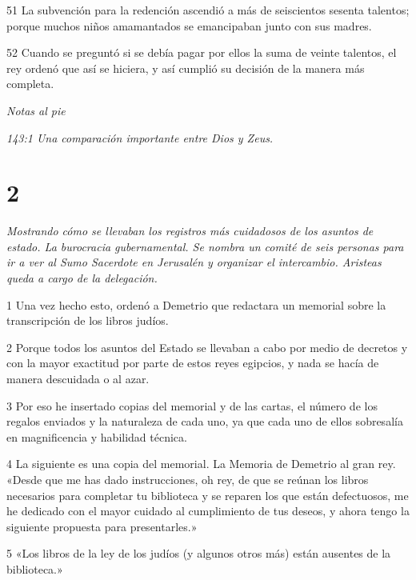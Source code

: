 \par 51 La subvención para la redención ascendió a más de seiscientos sesenta talentos; porque muchos niños amamantados se emancipaban junto con sus madres.

\par 52 Cuando se preguntó si se debía pagar por ellos la suma de veinte talentos, el rey ordenó que así se hiciera, y así cumplió su decisión de la manera más completa.

\par \textit{Notas al pie}
\par \textit{143:1 Una comparación importante entre Dios y Zeus.}

\chapter{2}

\par \textit{Mostrando cómo se llevaban los registros más cuidadosos de los asuntos de estado. La burocracia gubernamental. Se nombra un comité de seis personas para ir a ver al Sumo Sacerdote en Jerusalén y organizar el intercambio. Aristeas queda a cargo de la delegación.}

\par 1 Una vez hecho esto, ordenó a Demetrio que redactara un memorial sobre la transcripción de los libros judíos.

\par 2 Porque todos los asuntos del Estado se llevaban a cabo por medio de decretos y con la mayor exactitud por parte de estos reyes egipcios, y nada se hacía de manera descuidada o al azar.

\par 3 Por eso he insertado copias del memorial y de las cartas, el número de los regalos enviados y la naturaleza de cada uno, ya que cada uno de ellos sobresalía en magnificencia y habilidad técnica.

\par 4 La siguiente es una copia del memorial. La Memoria de Demetrio al gran rey. «Desde que me has dado instrucciones, oh rey, de que se reúnan los libros necesarios para completar tu biblioteca y se reparen los que están defectuosos, me he dedicado con el mayor cuidado al cumplimiento de tus deseos, y ahora tengo la siguiente propuesta para presentarles.»

\par 5 «Los libros de la ley de los judíos (y algunos otros más) están ausentes de la biblioteca.»

